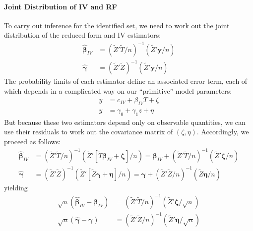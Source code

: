 \documentclass[12pt]{article}
\begin{document}
\paragraph{Joint Distribution of IV and RF}
To carry out inference for the identified set, we need to work out the joint distribution of the reduced form and IV estimators:
\begin{align*}
  \widehat{\boldsymbol{\beta}}_{IV} &= \left( \widetilde{Z}'\widetilde{T}/n \right)^{-1}\left( \widetilde{Z}'\mathbf{y}/n \right)\\
  \widehat{\boldsymbol{\gamma}} &= \left( \widetilde{Z}'\widetilde{Z} \right)^{-1}\left( \widetilde{Z}'\boldsymbol{y}/n \right)
\end{align*}
The probability limits of each estimator define an associated error term, each of which depends in a complicated way on our ``primitive'' model parameters:
\begin{align*}
  y &= c_{IV} + \beta_{IV} T + \zeta \\
  y &= \gamma_0 + \gamma_1 z + \eta 
\end{align*}
But because these two estimators depend only on observable quantities, we can use their residuals to work out the covariance matrix of $(\zeta, \eta)$. 
Accordingly, we proceed as follows:
\begin{align*}
  \widehat{\boldsymbol{\beta}}_{IV} &= \left( \widetilde{Z}'\widetilde{T}/n \right)^{-1}\left( \widetilde{Z}'\left[ \widetilde{T}\boldsymbol{\beta}_{IV} + \boldsymbol{\zeta} \right]/n \right) = \boldsymbol{\beta}_{IV} +\left( \widetilde{Z}'\widetilde{T}/n \right)^{-1}\left( \widetilde{Z}'\boldsymbol{\zeta}/n\right) \\
  \widehat{\boldsymbol{\gamma}} &= \left( \widetilde{Z}'\widetilde{Z} \right)^{-1}\left( \widetilde{Z}'\left[ \widetilde{Z}\boldsymbol{\gamma} + \boldsymbol{\eta} \right]/n \right) = \boldsymbol{\gamma} + \left( \widetilde{Z}'\widetilde{Z}/n \right)^{-1}\left( \widetilde{Z}\boldsymbol{\eta}/n \right)
\end{align*}
yielding
\begin{align*}
  \sqrt{n}\left(\widehat{\boldsymbol{\beta}}_{IV} - \boldsymbol{\beta}_{IV}\right) &= \left( \widetilde{Z}'\widetilde{T}/n \right)^{-1}\left( \widetilde{Z}'\boldsymbol{\zeta}/\sqrt{n}\right) \\
  \sqrt{n}\left(\widehat{\boldsymbol{\gamma}} - \boldsymbol{\gamma}\right) &=  \left( \widetilde{Z}'\widetilde{Z}/n \right)^{-1}\left( \widetilde{Z}'\boldsymbol{\eta}/\sqrt{n} \right)
\end{align*}
\end{document}
